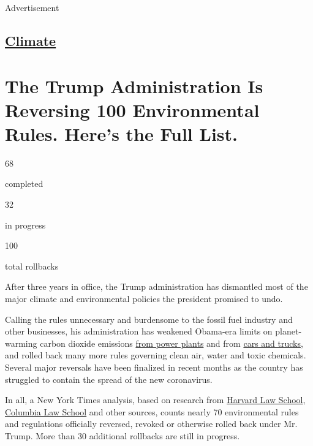 Advertisement

\hypertarget{-climate-}{%
\subsection{\texorpdfstring{ \href{/section/climate}{Climate}
}{ Climate }}\label{-climate-}}

\hypertarget{the-trump-administration-is-reversing-100-environmental-rules-heres-the-full-list}{%
\section{The Trump Administration Is Reversing 100 Environmental Rules.
Here's the Full
List.}\label{the-trump-administration-is-reversing-100-environmental-rules-heres-the-full-list}}

68

completed

32

in progress

100

total rollbacks

After three years in office, the Trump administration has dismantled
most of the major climate and environmental policies the president
promised to undo.

Calling the rules unnecessary and burdensome to the fossil fuel industry
and other businesses, his administration has weakened Obama-era limits
on planet-warming carbon dioxide emissions
\href{https://www.nytimes3xbfgragh.onion/2019/06/19/climate/epa-coal-emissions.html}{from
power plants} and from
\href{https://www.nytimes3xbfgragh.onion/2020/03/30/climate/trump-fuel-economy.html}{cars
and trucks}, and rolled back many more rules governing clean air, water
and toxic chemicals. Several major reversals have been finalized in
recent months as the country has struggled to contain the spread of the
new coronavirus.

In all, a New York Times analysis, based on research from
\href{https://eelp.law.harvard.edu/regulatory-rollback-tracker/}{Harvard
Law School},
\href{http://columbiaclimatelaw.com/resources/climate-deregulation-tracker/}{Columbia
Law School} and other sources, counts nearly 70 environmental rules and
regulations officially reversed, revoked or otherwise rolled back under
Mr. Trump. More than 30 additional rollbacks are still in progress.

\subsection{}

